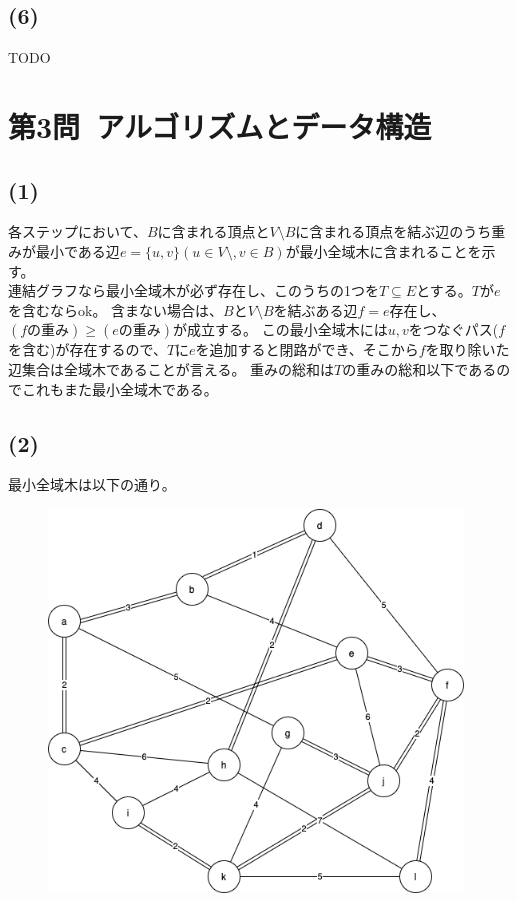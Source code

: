 \documentclass[a4paper,12pt,xelatex,ja=standard]{bxjsarticle}
\begin{document}
\subsection*{(6)}
TODO

\section*{第3問\ アルゴリズムとデータ構造}
\subsection*{(1)}
各ステップにおいて、$B$に含まれる頂点と$V \setminus B$に含まれる頂点を結ぶ辺のうち重みが最小である辺$e = \{u, v\} (u \in V \setminus, v \in B)$が最小全域木に含まれることを示す。\\
連結グラフなら最小全域木が必ず存在し、このうちの1つを$T \subseteq E$とする。$T$が$e$を含むならok。
含まない場合は、$B$と$V \setminus B$を結ぶある辺$f = e$存在し、$(f\text{の重み}) \geq (e\text{の重み})$が成立する。
この最小全域木には$u, v$をつなぐパス($f$を含む)が存在するので、$T$に$e$を追加すると閉路ができ、そこから$f$を取り除いた辺集合は全域木であることが言える。
重みの総和は$T$の重みの総和以下であるのでこれもまた最小全域木である。

\subsection*{(2)}
最小全域木は以下の通り。
\begin{figure}[H]
  \centering
  \includegraphics[width=11cm]{images/2016_min_spanning_tree.png}
\end{figure}
\end{document}
